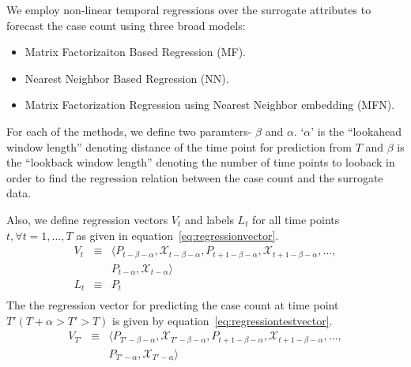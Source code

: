 
We employ non-linear temporal regressions over the surrogate attributes to forecast the
case count using three broad models:
\begin{itemize}
  \item Matrix Factorizaiton Based Regression (MF).
  \item Nearest Neighbor Based Regression (NN).
  \item Matrix Factorization Regression using Nearest Neighbor embedding (MFN).
\end{itemize}
For each of the methods, we define two paramters- $\beta$ and $\alpha$. 
`$\alpha$' is the ``lookahead window length'' denoting distance of the time point for prediction from $T$ 
 and $\beta$ is the ``lookback window length'' denoting the number of time points to looback
in order to find the regression relation between the case count and the surrogate 
data.

Also, we define regression vectors $V_t$  and 
labels $L_t$ for all time points $t, \forall t = 1,\dots, T$
as given in equation~\ref{eq:regressionvector}.
\begin{equation}
  \label{eq:regressionvector}
  \begin{array}{lcl}
    V_t & \equiv & \langle P_{t-\beta - \alpha}, \mathcal{X}_{t-\beta - \alpha}, P_{t + 1 -\beta-\alpha}, \mathcal{X}_{t + 1 - \beta-\alpha}, \dots, \\
        &        & P_{t-\alpha},\mathcal{X}_{t-\alpha} \rangle \\
    L_t & \equiv & P_{t}\\
  \end{array}
\end{equation}
The the regression vector for predicting the case count at time point $T' (T +
\alpha > T' > T)$ is given by equation~\ref{eq:regressiontestvector}.
\begin{equation}
  \label{eq:regressiontestvector}
  \begin{array}{lcl}
    V_{T'} & \equiv & \langle P_{T'-\beta - \alpha}, \mathcal{X}_{T'-\beta - \alpha}, P_{t + 1 -\beta-\alpha}, \mathcal{X}_{t + 1 - \beta-\alpha}, \dots, \\
           &        & P_{T'-\alpha},\mathcal{X}_{T'-\alpha} \rangle \\
  \end{array}
\end{equation}

